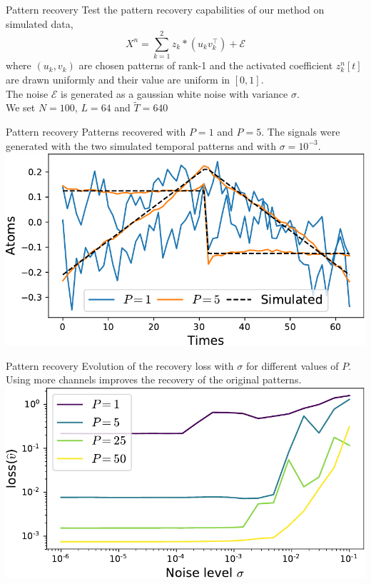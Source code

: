 \documentclass{beamer}
\def\tT{\widetilde{T}}
\begin{document}
\begin{frame}[noframenumbering]{Pattern recovery}
Test the pattern recovery capabilities of our method on simulated data,
\[
X^n = \sum_{k=1}^2 z_k * (u_kv_k^\top) + \mathcal E
\]
where $(u_k, v_k)$ are chosen patterns of rank-1 and the activated coefficient $z^n_k[t]$ are drawn uniformly and their value are uniform in $[0, 1]$.\\[1em]
The noise $\mathcal E$ is generated as a gaussian white noise with variance $\sigma$.\\[1em]

We set $N=100$, $L=64$ and $\tT=640$
\end{frame}

\begin{frame}[noframenumbering]{Pattern recovery}
Patterns recovered with $P = 1$ and $P=5$. The signals were generated with the two simulated temporal patterns and with  $\sigma = 10^{-3}$. \\[1em]
\includegraphics[width=\textwidth]{1D_vs_multi_uv_hat_P5.pdf}
\end{frame}
\begin{frame}[noframenumbering]{Pattern recovery}
Evolution of the recovery loss with $\sigma$ for different values of $P$. Using more channels improves the recovery of the original patterns.\\[1em]
\includegraphics[width=\textwidth]{1D_vs_multi.pdf}
\end{frame}
\end{document}

